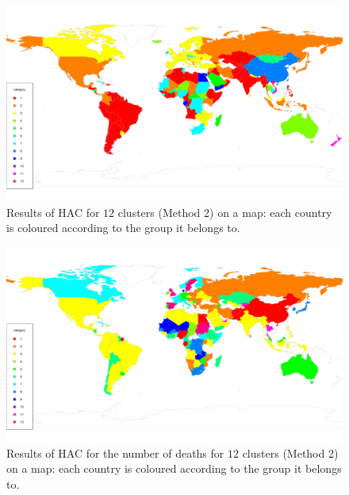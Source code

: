 \documentclass[a4paper,12pt]{article}
\numberwithin{equation}{section}
\begin{document}
\begin{figure}[t!]
\begin{minipage}[t]{0.98\textwidth}
\includegraphics[width=\textwidth]{plots/14days/map_alt_12cl}
\caption{Results of HAC for $12$ clusters (Method 2) on a map: each country is coloured according to the group it belongs to.}
\end{minipage}
\end{figure}

\begin{figure}[t!]
\begin{minipage}[t]{0.98\textwidth}
\includegraphics[width=\textwidth]{plots/deaths/map_alt}
\caption{Results of HAC for the number of deaths for $12$ clusters (Method 2) on a map: each country is coloured according to the group it belongs to.}
\end{minipage}
\end{figure}
\end{document}
